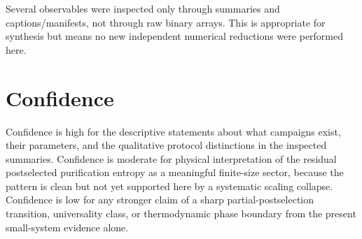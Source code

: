 \documentclass[aps,prb,onecolumn,nofootinbib,superscriptaddress]{revtex4-2}
\begin{document}
Several observables were inspected only through summaries and captions/manifests,
not through raw binary arrays.  This is appropriate for synthesis but means no
new independent numerical reductions were performed here.

\section{Confidence}

Confidence is high for the descriptive statements about what campaigns exist,
their parameters, and the qualitative protocol distinctions in the inspected
summaries.  Confidence is moderate for physical interpretation of the residual
postselected purification entropy as a meaningful finite-size sector, because
the pattern is clean but not yet supported here by a systematic scaling collapse.
Confidence is low for any stronger claim of a sharp partial-postselection
transition, universality class, or thermodynamic phase boundary from the present
small-system evidence alone.
\end{document}
